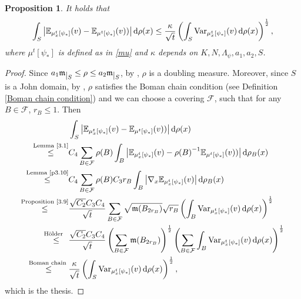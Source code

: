\documentclass[a4paper,11pt]{article}
\numberwithin{equation}{section}
\theoremstyle{plain}
\newtheorem{proposition}[theorem]{Proposition}
\theoremstyle{definition}
\theoremstyle{remark}
\newcommand{\mm}{\mathfrak m}
\newcommand{\E}{\mathbb{E}}
\renewcommand{\d}{{\mathrm d}}
\newcommand{\restr}[1]{\lower3pt\hbox{$|_{#1}$}}
\begin{document}
	\begin{proposition}\label{2.11}
	It holds that
	\begin{equation}
	\int_{S}\big| \E_{\mu_x^t[\psi_*]}(v)-\E_{\mu^t[\psi_*]}(v))\big|\,\d\rho(x)\leq  \frac{\kappa}{\sqrt{t}}\left(\int_S {\rm{Var}}_{ \mu_x^t[\psi_*]}(v)\,\d\rho(x)\right)^\frac{1}{2},
	\end{equation}
	where $\mu^t[\psi_*]$ is defined as in \eqref{mu} and $\kappa$ depends on $K,N,\Lambda_\psi,a_1,a_2, S$.
	\end{proposition}
	\begin{proof}
		Since $a_1\mm\restr{S} \leq \rho\leq a_2\mm\restr{S}$, by \cite[Corollary 2.4]{zbMATH05049052}, $\rho$ is a doubling measure. Moreover, 
		since $S$ is a John domain, by \cite[Proposition 3.7]{arXiv:2504.05412}, $\rho$ satisfies the Boman chain condition (see Definition \ref{Boman chain condition}) and we can choose a covering $\mathcal{F}$, such that for any $B\in \mathcal{F}$, $r_B\leq 1$. Then 
		\begin{equation}
			\begin{aligned}
				&\int_{S}\big| \E_{\mu_x^t[\psi_*]}(v)-\E_{\mu^t[\psi_*]}(v))\big|\,\d\rho(x)\\
				\mathop{\leq}^{\text {Lemma \ref{3.1}}} &C_4 \sum_{B\in\mathcal{F}}\rho(B)\int_B \big| \E_{\mu_x^t[\psi_*]}(v)-{\rho(B)}^{-1}\E_{\mu^t[\psi_*]}(v))\big|\,\d\rho_B(x)\\
				\mathop{\leq }^{\text{Lemma \ref{p3.10}}}&C_4 \sum_{B\in\mathcal{F}}\rho(B)C_3 r_B\int_B \big|\nabla_x \E_{\mu_x^t[\psi_*]}(v)\big|\,\d\rho_B(x)\\
			\mathop{\leq}^{\text{Proposition \ref{3.9}} }&  \frac{\sqrt{C_2}C_3C_4}{\sqrt{t}}\sum_{B\in\mathcal{F}}\sqrt{\mm(B_{2r_B})}\sqrt{r_B}\left(\int_B {\rm{Var}}_{ \mu_x^t[\psi_*]}(v)\,\d\rho(x)\right)^\frac{1}{2}\\
				\mathop{\leq}^{\text{H\"{o}lder}~~}&\frac{\sqrt{C_2}C_3C_4}{\sqrt{t}}\left(\sum_{B\in\mathcal{F}}\mm(B_{2r_B})\right)^\frac{1}{2}\left(\sum_{B\in\mathcal{F}}\int_B {\rm{Var}}_{ \mu_x^t[\psi_*]}(v)\,\d\rho(x)\right)^\frac{1}{2}\\
					\overset{\text{Boman chain~}}{\leq}&\frac{\kappa}{\sqrt{t}}\left(\int_S {\rm{Var}}_{ \mu_x^t[\psi_*]}(v)\,\d\rho(x)\right)^\frac{1}{2},
			\end{aligned}
		\end{equation}
		which is the thesis.
	\end{proof}
	
	
	
	
\end{document}
